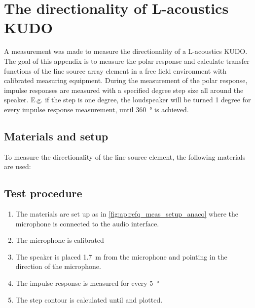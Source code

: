 \chapter{The directionality of L-acoustics KUDO}\label{ap:dir_of_kudo}
A measurement was made to measure the directionality of a L-acoustics KUDO.  The goal of this appendix is to measure the polar response and calculate transfer functions of the line source array element in a free field environment with calibrated measuring equipment. During the measurement of the polar response, impulse responses are measured with a specified degree step size all around the speaker. E.g. if the step is one degree, the loudspeaker will be turned 1 degree for every  impulse response measurement, until \SI{360}{\degree} is achieved.


\section*{Materials and setup}
To measure the directionality of the line source element, the following materials are used:

\startequipment
{}
\stopequipment




\section*{Test procedure}


\begin{enumerate}
\item The materials are set up as in \autoref{fig:ap:refq_meas_setup_anaco} where the  microphone is connected to the audio interface.
\item The microphone is calibrated
\item The speaker is placed \SI{1.7}{\meter} from the microphone and pointing in the direction of the microphone.
\item	The impulse response is measured for every \SI{5}{\degree}
\item The  step contour is calculated until  and plotted.
\end{enumerate}


